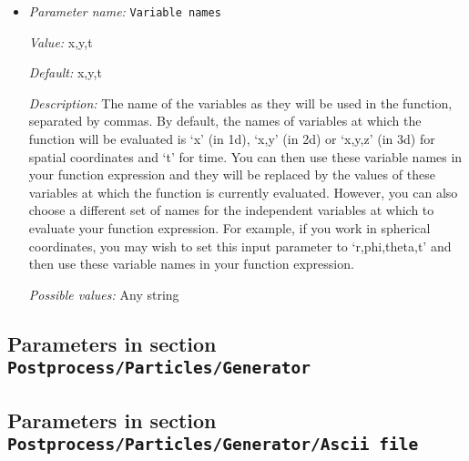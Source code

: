 \begin{itemize}
{\it Value:} 1


{\it Default:} 1


{\it Description:} The number of function components where each component is described by a function expression delimited by a ';'.


{\it Possible values:} An integer $n$ such that $0\leq n \leq 2147483647$
\item {\it Parameter name:} {\tt Variable names}
\label{parameters:Postprocess/Particles/Function/Variable names}


{\it Value:} x,y,t


{\it Default:} x,y,t


{\it Description:} The name of the variables as they will be used in the function, separated by commas. By default, the names of variables at which the function will be evaluated is `x' (in 1d), `x,y' (in 2d) or `x,y,z' (in 3d) for spatial coordinates and `t' for time. You can then use these variable names in your function expression and they will be replaced by the values of these variables at which the function is currently evaluated. However, you can also choose a different set of names for the independent variables at which to evaluate your function expression. For example, if you work in spherical coordinates, you may wish to set this input parameter to `r,phi,theta,t' and then use these variable names in your function expression.


{\it Possible values:} Any string
\end{itemize}

\subsection{Parameters in section \tt Postprocess/Particles/Generator}
\label{parameters:Postprocess/Particles/Generator}


\subsection{Parameters in section \tt Postprocess/Particles/Generator/Ascii file}
\label{parameters:Postprocess/Particles/Generator/Ascii_20file}

